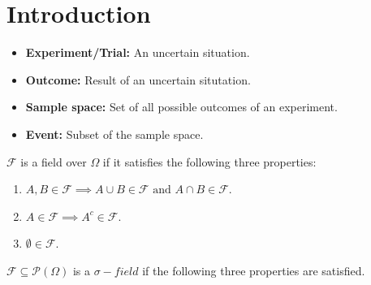 \section{Introduction}

\begin{itemize}
\item \textbf{Experiment/Trial:} An uncertain situation.\\
\item \textbf{Outcome:} Result of an uncertain situtation.\\
\item \textbf{Sample space:} Set of all possible outcomes of an experiment.\\
\item \textbf{Event:} Subset of the sample space.\\
\end{itemize}

\begin{definition}[Field]
   $\mathscr{F}$ is a field over $\Omega$ if it satisfies the following three properties:
   \begin{enumerate}
        \item $A, B \in \mathscr{F}\implies A\cup B \in \mathscr{F} \text{ and } A\cap B \in \mathscr{F}$.
        \item $A \in \mathscr{F} \implies A^c \in \mathscr{F}$.
        \item $\emptyset \in \mathscr{F}$.
   \end{enumerate}
\end{definition}

\begin{definition}
    $\mathscr{F} \subseteq \mathscr{P}(\Omega)$ is a \textbf{$\sigma -field$} if the following three properties are satisfied.
\end{definition}